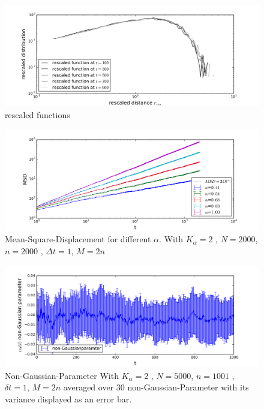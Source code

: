 \documentclass[
  a4paper,BCOR10mm,oneside,
  bibtotoc,idxtotoc,
  headsepline,footsepline,%
  fleqn,openbib
]{scrbook}
\begin{document}
\begin{figure}[h]
\includegraphics[width=\textwidth]{./data/rescaled.png}
\caption{rescaled functions}
 \centering
\end{figure}

\begin{figure}[h]
\includegraphics[width=\textwidth]{./data/alpha_change.png}
\caption{Mean-Square-Displacement for different $\alpha$. With $K_{\alpha}=2$ , $N=2000$, $n=2000$ , $\Delta t = 1$, $M=2n$ }
 \centering
\end{figure}

\begin{figure}[h]
\includegraphics[width=\textwidth]{./data/nongaussian.png}
\caption{Non-Gaussian-Parameter With $K_{\alpha}=2$ , $N=5000$, $n=1001$ , $\delta t = 1$, $M=2n$ averaged over $30$ non-Gaussian-Parameter with its variance displayed as an error bar.}
 \centering
\end{figure}
\end{document}
